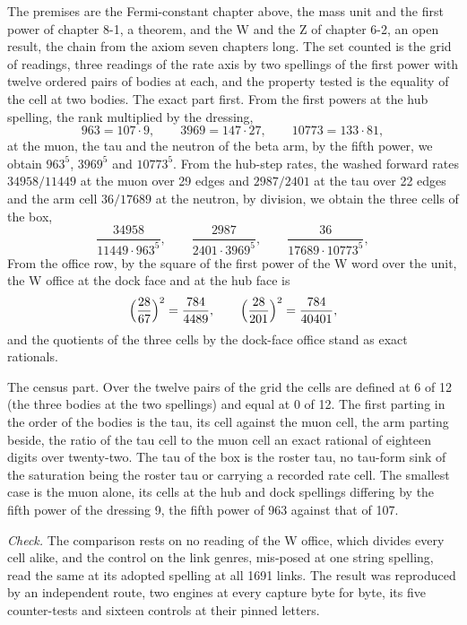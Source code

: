 \begin{chproof}[census]
The premises are the Fermi-constant chapter above, the mass unit and the first power of chapter 8-1, a theorem, and the W and the Z of chapter 6-2, an open result, the chain from the axiom seven chapters long. The set counted is the grid of readings, three readings of the rate axis by two spellings of the first power with twelve ordered pairs of bodies at each, and the property tested is the equality of the cell at two bodies. The exact part first. From the first powers at the hub spelling, the rank multiplied by the dressing,
\begin{equation}
963 = 107 \cdot 9, \qquad 3969 = 147 \cdot 27, \qquad 10773 = 133 \cdot 81 ,
\end{equation}
at the muon, the tau and the neutron of the beta arm, by the fifth power, we obtain $963^{5}$, $3969^{5}$ and $10773^{5}$. From the hub-step rates, the washed forward rates $34958/11449$ at the muon over 29 edges and $2987/2401$ at the tau over 22 edges and the arm cell $36/17689$ at the neutron, by division, we obtain the three cells of the box,
\begin{equation}
\frac{34958}{11449 \cdot 963^{5}}, \qquad \frac{2987}{2401 \cdot 3969^{5}}, \qquad \frac{36}{17689 \cdot 10773^{5}} ,
\end{equation}
From the office row, by the square of the first power of the W word over the unit, the W office at the dock face and at the hub face is
\begin{equation}
\Bigl(\frac{28}{67}\Bigr)^{2} = \frac{784}{4489}, \qquad \Bigl(\frac{28}{201}\Bigr)^{2} = \frac{784}{40401} ,
\end{equation}
and the quotients of the three cells by the dock-face office stand as exact rationals.

The census part. Over the twelve pairs of the grid the cells are defined at 6 of 12 (the three bodies at the two spellings) and equal at 0 of 12. The first parting in the order of the bodies is the tau, its cell against the muon cell, the arm parting beside, the ratio of the tau cell to the muon cell an exact rational of eighteen digits over twenty-two. The tau of the box is the roster tau, no tau-form sink of the saturation being the roster tau or carrying a recorded rate cell. The smallest case is the muon alone, its cells at the hub and dock spellings differing by the fifth power of the dressing 9, the fifth power of 963 against that of 107.

\emph{Check.} The comparison rests on no reading of the W office, which divides every cell alike, and the control on the link genres, mis-posed at one string spelling, read the same at its adopted spelling at all 1691 links. The result was reproduced by an independent route, two engines at every capture byte for byte, its five counter-tests and sixteen controls at their pinned letters.
\end{chproof}
\label{chend:VI-5-D538919-w-fcwo}

